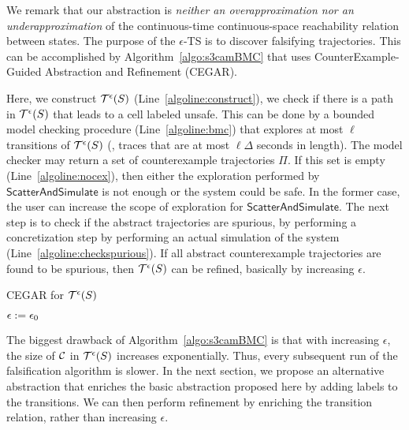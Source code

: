 We remark that our abstraction is {\em neither an overapproximation
nor an underapproximation} of the continuous-time continuous-space
reachability relation between states. The purpose of the $\epsilon$-TS
is to discover falsifying trajectories. This can be accomplished by
Algorithm~\ref{algo:s3camBMC} that uses CounterExample-Guided
Abstraction and Refinement (CEGAR).

Here, we construct $\mathcal{T}^{\epsilon}(S)$
(Line~\ref{algoline:construct}), we check if there is a path in
$\mathcal{T}^{\epsilon}(S)$ that leads to a cell labeled
unsafe. This can be done by a bounded model checking procedure
(Line~\ref{algoline:bmc}) that explores at most $\ell$ transitions of
$\mathcal{T}^{\epsilon}(S)$ (\ie, traces that are at most
$\ell\Delta$ seconds in length). The model checker may return a set of
counterexample trajectories $\Pi$. If this set is empty
(Line~\ref{algoline:nocex}), then either the exploration performed by
$\mathsf{ScatterAndSimulate}$ is not enough or the system could be
safe. In the former case, the user can increase the scope of
exploration for $\mathsf{ScatterAndSimulate}$.  The next step is to
check if the abstract trajectories are spurious, by performing a
concretization step by performing an actual simulation of the system
(Line~\ref{algoline:checkspurious}). If all abstract counterexample
trajectories are found to be spurious, then
$\mathcal{T}^{\epsilon}(S)$ can be refined, basically by
increasing $\epsilon$.
\begin{algorithm}[t]
\DontPrintSemicolon
\caption{CEGAR for $\mathcal{T}^{\epsilon}(S)$\label{algo:s3camBMC}}
$\epsilon := \epsilon_0$ \;
\end{algorithm}

The biggest drawback of Algorithm~\ref{algo:s3camBMC} is that with
increasing $\epsilon$, the size of $\mathcal{C}$ in
$\mathcal{T}^{\epsilon}(S)$ increases exponentially.  Thus,
every subsequent run of the falsification algorithm is slower. In the
next section, we propose an alternative abstraction that enriches the
basic abstraction proposed here by adding labels to the transitions.
We can then perform refinement by enriching the transition relation,
rather than increasing $\epsilon$.

